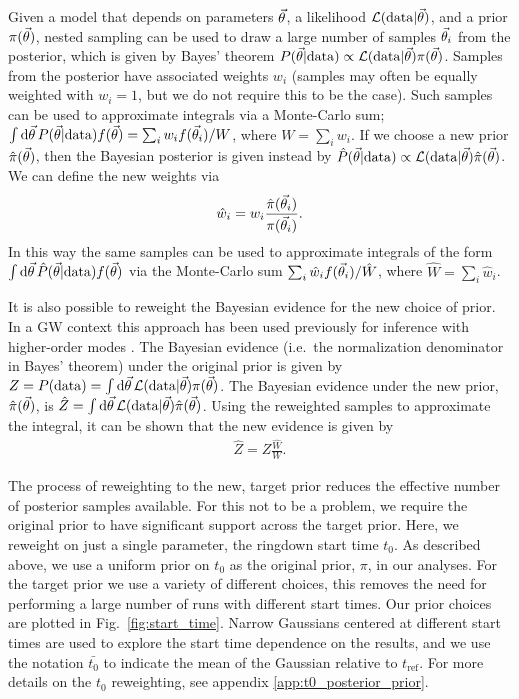 Given a model that depends on parameters $\vec{\theta}$, a likelihood $\mathcal{L}(\mathrm{data}|\vec{\theta})$, and a prior $\pi(\vec{\theta})$, nested sampling can be used to draw a large number of samples $\vec{\theta}_i$ from the posterior, which is given by Bayes' theorem $P(\vec{\theta}|\mathrm{data})\propto \mathcal{L}(\mathrm{data}|\vec{\theta}) \pi(\vec{\theta})$.
Samples from the posterior have associated weights $w_i$ (samples may often be equally weighted with $w_i=1$, but we do not require this to be the case). 
Such samples can be used to approximate integrals via a Monte-Carlo sum; $\int \mathrm{d}\vec{\theta}\,P(\vec{\theta}|\mathrm{data})f(\vec{\theta})=\sum_{i}w_i f(\vec{\theta}_i)/W$, where $W=\sum_{i}w_i$.
If we choose a new prior $\hat{\pi}(\vec{\theta})$, then the Bayesian posterior is given instead by $\hat{P}(\vec{\theta}|\mathrm{data})\propto \mathcal{L}(\mathrm{data}|\vec{\theta}) \hat{\pi}(\vec{\theta})$.
We can define the new weights via
\begin{align}
	\hat{w}_i = w_i \frac{\hat{\pi}(\vec{\theta}_i)}{\pi(\vec{\theta}_i)}.
\end{align}
In this way the same samples can be used to approximate integrals of the form $\int \mathrm{d}\vec{\theta}\,\hat{P}(\vec{\theta}|\mathrm{data})f(\vec{\theta})$ via the Monte-Carlo sum $\sum_{i}\hat{w}_i f(\vec{\theta}_i)/\hat{W}$, where $\hat{W}=\sum_{i}\hat{w}_i$.

It is also possible to reweight the Bayesian evidence for the new choice of prior.
In a GW context this approach has been used previously for inference with higher-order modes \cite{Payne:2019wmy}.
The Bayesian evidence (i.e.\ the normalization denominator in Bayes' theorem) under the original prior is given by $Z=P(\mathrm{data})=\int\mathrm{d}\vec{\theta}\,\mathcal{L}(\mathrm{data}|\vec{\theta})\pi(\vec{\theta})$.
The Bayesian evidence under the new prior, $\hat{\pi}(\vec{\theta})$, is $\hat{Z}=\int\mathrm{d}\vec{\theta}\,\mathcal{L}(\mathrm{data}|\vec{\theta})\hat{\pi}(\vec{\theta})$. Using the reweighted samples to approximate the integral, it can be shown that the new evidence is given by
\begin{align}\label{eq:new_evidence}
	\hat{Z} = Z\frac{\hat{W}}{W}.
\end{align}

The process of reweighting to the new, target prior reduces the effective number of posterior samples available.
For this not to be a problem, we require the original prior to have significant support across the target prior.
Here, we reweight on just a single parameter, the ringdown start time $t_0$.
As described above, we use a uniform prior on $t_0$ as the original prior, $\pi$, in our analyses.
For the target prior we use a variety of different choices, this removes the need for performing a large number of runs with different start times. 
Our prior choices are plotted in Fig.~\ref{fig:start_time}.
Narrow Gaussians centered at different start times are used to explore the start time dependence on the results, and we use the notation $\bar{t_0}$ to indicate the mean of the Gaussian relative to $t_\mathrm{ref}$. 
For more details on the $t_0$ reweighting, see appendix \ref{app:t0_posterior_prior}.

